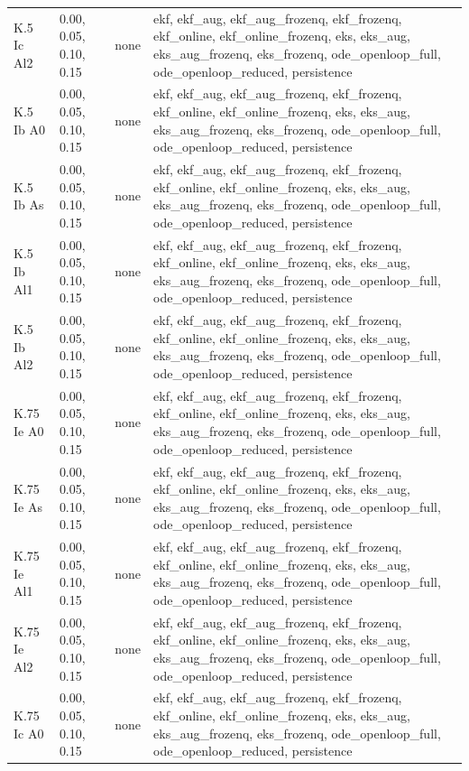 \begin{table}[t]
\begin{tabular}{llll}
K.5 Ic Al2 & 0.00, 0.05, 0.10, 0.15 & none & ekf, ekf\_aug, ekf\_aug\_frozenq, ekf\_frozenq, ekf\_online, ekf\_online\_frozenq, eks, eks\_aug, eks\_aug\_frozenq, eks\_frozenq, ode\_openloop\_full, ode\_openloop\_reduced, persistence \\
K.5 Ib A0 & 0.00, 0.05, 0.10, 0.15 & none & ekf, ekf\_aug, ekf\_aug\_frozenq, ekf\_frozenq, ekf\_online, ekf\_online\_frozenq, eks, eks\_aug, eks\_aug\_frozenq, eks\_frozenq, ode\_openloop\_full, ode\_openloop\_reduced, persistence \\
K.5 Ib As & 0.00, 0.05, 0.10, 0.15 & none & ekf, ekf\_aug, ekf\_aug\_frozenq, ekf\_frozenq, ekf\_online, ekf\_online\_frozenq, eks, eks\_aug, eks\_aug\_frozenq, eks\_frozenq, ode\_openloop\_full, ode\_openloop\_reduced, persistence \\
K.5 Ib Al1 & 0.00, 0.05, 0.10, 0.15 & none & ekf, ekf\_aug, ekf\_aug\_frozenq, ekf\_frozenq, ekf\_online, ekf\_online\_frozenq, eks, eks\_aug, eks\_aug\_frozenq, eks\_frozenq, ode\_openloop\_full, ode\_openloop\_reduced, persistence \\
K.5 Ib Al2 & 0.00, 0.05, 0.10, 0.15 & none & ekf, ekf\_aug, ekf\_aug\_frozenq, ekf\_frozenq, ekf\_online, ekf\_online\_frozenq, eks, eks\_aug, eks\_aug\_frozenq, eks\_frozenq, ode\_openloop\_full, ode\_openloop\_reduced, persistence \\
K.75 Ie A0 & 0.00, 0.05, 0.10, 0.15 & none & ekf, ekf\_aug, ekf\_aug\_frozenq, ekf\_frozenq, ekf\_online, ekf\_online\_frozenq, eks, eks\_aug, eks\_aug\_frozenq, eks\_frozenq, ode\_openloop\_full, ode\_openloop\_reduced, persistence \\
K.75 Ie As & 0.00, 0.05, 0.10, 0.15 & none & ekf, ekf\_aug, ekf\_aug\_frozenq, ekf\_frozenq, ekf\_online, ekf\_online\_frozenq, eks, eks\_aug, eks\_aug\_frozenq, eks\_frozenq, ode\_openloop\_full, ode\_openloop\_reduced, persistence \\
K.75 Ie Al1 & 0.00, 0.05, 0.10, 0.15 & none & ekf, ekf\_aug, ekf\_aug\_frozenq, ekf\_frozenq, ekf\_online, ekf\_online\_frozenq, eks, eks\_aug, eks\_aug\_frozenq, eks\_frozenq, ode\_openloop\_full, ode\_openloop\_reduced, persistence \\
K.75 Ie Al2 & 0.00, 0.05, 0.10, 0.15 & none & ekf, ekf\_aug, ekf\_aug\_frozenq, ekf\_frozenq, ekf\_online, ekf\_online\_frozenq, eks, eks\_aug, eks\_aug\_frozenq, eks\_frozenq, ode\_openloop\_full, ode\_openloop\_reduced, persistence \\
K.75 Ic A0 & 0.00, 0.05, 0.10, 0.15 & none & ekf, ekf\_aug, ekf\_aug\_frozenq, ekf\_frozenq, ekf\_online, ekf\_online\_frozenq, eks, eks\_aug, eks\_aug\_frozenq, eks\_frozenq, ode\_openloop\_full, ode\_openloop\_reduced, persistence \\

\end{tabular}
\end{table}
